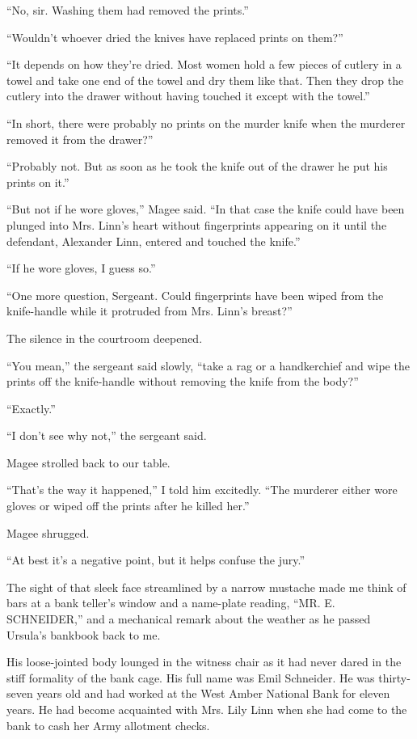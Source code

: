 \documentclass{novel}
\begin{document}
“No, sir. Washing them had removed the prints.”

“Wouldn’t whoever dried the knives have replaced prints on them?”

“It depends on how they’re dried. Most women hold a few pieces of cutlery in a towel and take one end of the towel and dry them like that. Then they drop the cutlery into the drawer without having touched it except with the towel.”

“In short, there were probably no prints on the murder knife when the murderer removed it from the drawer?”

“Probably not. But as soon as he took the knife out of the drawer he put his prints on it.”

“But not if he wore gloves,” Magee said. “In that case the knife could have been plunged into Mrs. Linn’s heart without fingerprints appearing on it until the defendant, Alexander Linn, entered and touched the knife.”

“If he wore gloves, I guess so.”

“One more question, Sergeant. Could fingerprints have been wiped from the knife-handle while it protruded from Mrs. Linn’s breast?”

The silence in the courtroom deepened.

“You mean,” the sergeant said slowly, “take a rag or a handkerchief and wipe the prints off the knife-handle without removing the knife from the body?”

“Exactly.”

“I don’t see why not,” the sergeant said.

Magee strolled back to our table.

“That’s the way it happened,” I told him excitedly. “The murderer either wore gloves or wiped off the prints after he killed her.”

Magee shrugged.

“At best it’s a negative point, but it helps confuse the jury.”

\scenestars

The sight of that sleek face streamlined by a narrow mustache made me think of bars at a bank teller’s window and a name-plate reading, “MR. E. SCHNEIDER,” and a mechanical remark about the weather as he passed Ursula’s bankbook back to me.

His loose-jointed body lounged in the witness chair as it had never dared in the stiff formality of the bank cage. His full name was Emil Schneider. He was thirty-seven years old and had worked at the West Amber National Bank for eleven years. He had become acquainted with Mrs. Lily Linn when she had come to the bank to cash her Army allotment checks.
\end{document}
